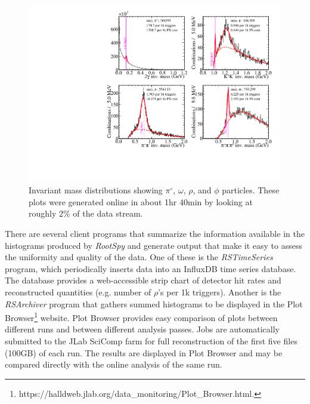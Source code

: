 \begin{figure}[tbp]
\begin{center}
\includegraphics[width=0.99\textwidth]{figures/online_monitoring_PID.pdf}
\caption{\label{fig:online_monitoring_PID}Invariant mass distributions showing $\pi^\circ$, $\omega$, $\rho$, and $\phi$ particles. These plots were generated online in about 1hr 40min by looking at roughly 2\% of the data stream.}   
\end{center}  
\end{figure}

There are several client programs that summarize the information available in the histograms produced by \textit{RootSpy} and generate output that make it easy to assess the uniformity and quality of the data. One of these is the \textit{RSTimeSeries} program, which periodically inserts data into an InfluxDB time series database. The database provides a web-accessible strip chart of detector hit rates and reconstructed quantities (e.g. number of $\rho$'s per 1k triggers). Another is the \textit{RSArchiver} program that gathers summed histograms to be displayed in the Plot Browser\footnote{https://halldweb.jlab.org/data\_monitoring/Plot\_Browser.html.} website. Plot Browser provides easy comparison of plots between different runs and between different analysis passes. Jobs are automatically submitted to the JLab SciComp farm for full reconstruction of the first five files (100GB) of each run. The results are displayed in Plot Browser and may be compared directly with the online analysis of the same run.


